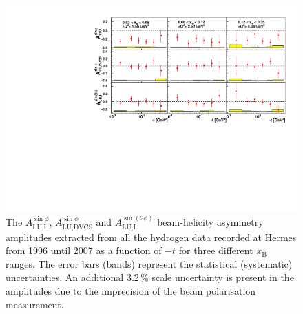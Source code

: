 \begin{figure}
 \begin{center}
 \includegraphics[width=15cm]{bsadvcsplots_tc_xbjrange_eml_par13_bin6_9607_pic_dual}
  \caption{The $A_{\textrm{LU,I}}^{\sin\phi}$, $A_{\textrm{LU,DVCS}}^{\sin\phi}$ and
$A_{\textrm{LU,I}}^{\sin(2\phi)}$ beam-helicity asymmetry amplitudes extracted from all the hydrogen data recorded at H{\sc ermes} from 1996 until 2007 as a function of $-t$ for three different $x_{\textrm{B}}$ ranges. The error bars (bands) represent the statistical (systematic) uncertainties. An additional 3.2\,\% scale uncertainty is present in the amplitudes due to the imprecision of the beam polarisation measurement.}
  \label{bsa_xbjrange2}
 \end{center}
\end{figure}

